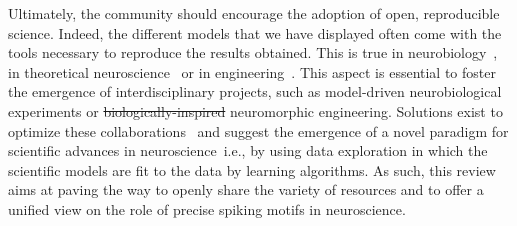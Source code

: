 \documentclass[brainsci, %
               review,accept,pdftex,moreauthors %
               ]{Definitions/mdpi}
\providecommand{\DIFadd}[1]{{\protect\color{blue}\uwave{#1}}} %
\providecommand{\DIFdel}[1]{{\protect\color{red}\sout{#1}}}                      %
\providecommand{\DIFaddbegin}{} %
\providecommand{\DIFaddend}{} %
\providecommand{\DIFdelbegin}{} %
\providecommand{\DIFdelend}{} %
\newcommand{\DIFscaledelfig}{0.5}
\newlength{\DIFdelgraphicswidth} %
\newlength{\DIFdelgraphicsheight} %
\newcommand{\DIFaddincludegraphics}[2][]{{\color{blue}\fbox{\DIFOincludegraphics[#1]{#2}}}} %
\newcommand{\DIFdelincludegraphics}[2][]{%
\sbox{\DIFdelgraphicsbox}{\DIFOincludegraphics[#1]{#2}}%
\settoboxwidth{\DIFdelgraphicswidth}{\DIFdelgraphicsbox} %
\settoboxtotalheight{\DIFdelgraphicsheight}{\DIFdelgraphicsbox} %
\scalebox{\DIFscaledelfig}{%
\parbox[b]{\DIFdelgraphicswidth}{\usebox{\DIFdelgraphicsbox}\\[-\baselineskip] \rule{\DIFdelgraphicswidth}{0em}}\llap{\resizebox{\DIFdelgraphicswidth}{\DIFdelgraphicsheight}{%
\setlength{\unitlength}{\DIFdelgraphicswidth}%
\begin{picture}(1,1)%
\thicklines\linethickness{2pt} %
{\color[rgb]{1,0,0}\put(0,0){\framebox(1,1){}}}%
{\color[rgb]{1,0,0}\put(0,0){\line( 1,1){1}}}%
{\color[rgb]{1,0,0}\put(0,1){\line(1,-1){1}}}%
\end{picture}%
}\hspace*{3pt}}} %
} %
\DeclareRobustCommand{\DIFaddbegin}{\DIFOaddbegin \let\includegraphics\DIFaddincludegraphics} %
\DeclareRobustCommand{\DIFaddend}{\DIFOaddend \let\includegraphics\DIFOincludegraphics} %
\DeclareRobustCommand{\DIFdelbegin}{\DIFOdelbegin \let\includegraphics\DIFdelincludegraphics} %
\DeclareRobustCommand{\DIFdelend}{\DIFOaddend \let\includegraphics\DIFOincludegraphics} %
\begin{document}
Ultimately, the community should encourage the adoption of open, reproducible science. Indeed, the different models that we have displayed often come with the tools necessary to reproduce the results obtained. This is true in neurobiology~\citep{bellec_fitting_2021}, in theoretical neuroscience~\citep{izhikevich_polychronization_2006} or in engineering~\citep{grimaldi_robust_2022}. This aspect is essential to foster the emergence of interdisciplinary projects, such as model-driven neurobiological experiments or \DIFdelbegin \DIFdel{biologically-inspired }\DIFdelend \DIFaddbegin \DIFadd{biologically inspired }\DIFaddend neuromorphic engineering. Solutions exist to optimize these collaborations~\citep{panahi_generative_2021} and suggest the emergence of a novel paradigm for scientific advances in neuroscience~\citep{tolle_fourth_2011}\DIFaddbegin \DIFadd{, }\DIFaddend i.e., by using data exploration in which the scientific models are fit to the data by learning algorithms. As such, this review aims at paving the way to openly share the variety of resources and to offer a unified view on the role of precise spiking motifs in neuroscience.
\vspace{6pt} 


\end{document}
